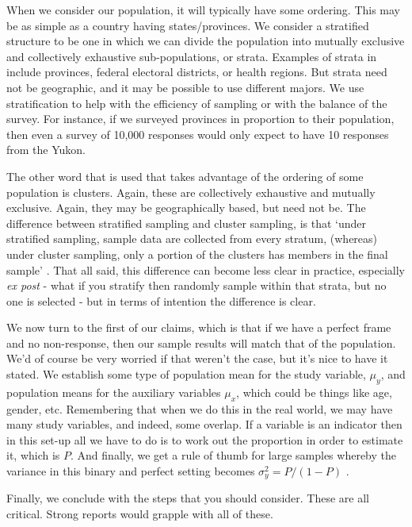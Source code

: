 \documentclass[
]{book}
\begin{document}
When we consider our population, it will typically have some ordering. This may be as simple as a country having states/provinces. We consider a stratified structure to be one in which we can divide the population into mutually exclusive and collectively exhaustive sub-populations, or strata. Examples of strata in \citet[p.~8]{wuandthompson} include provinces, federal electoral districts, or health regions. But strata need not be geographic, and it may be possible to use different majors. We use stratification to help with the efficiency of sampling or with the balance of the survey. For instance, if we surveyed provinces in proportion to their population, then even a survey of 10,000 responses would only expect to have 10 responses from the Yukon.

The other word that is used that takes advantage of the ordering of some population is clusters. Again, these are collectively exhaustive and mutually exclusive. Again, they may be geographically based, but need not be. The difference between stratified sampling and cluster sampling, is that `under stratified sampling, sample data are collected from every stratum, (whereas) under cluster sampling, only a portion of the clusters has members in the final sample' \citet[p.~8]{wuandthompson}. That all said, this difference can become less clear in practice, especially \emph{ex post} - what if you stratify then randomly sample within that strata, but no one is selected - but in terms of intention the difference is clear.

We now turn to the first of our claims, which is that if we have a perfect frame and no non-response, then our sample results will match that of the population. We'd of course be very worried if that weren't the case, but it's nice to have it stated. We establish some type of population mean for the study variable, \(\mu_y\), and population means for the auxiliary variables \(\mu_x\), which could be things like age, gender, etc. Remembering that when we do this in the real world, we may have many study variables, and indeed, some overlap. If a variable is an indicator then in this set-up all we have to do is to work out the proportion in order to estimate it, which is \(P\). And finally, we get a rule of thumb for large samples whereby the variance in this binary and perfect setting becomes \(\sigma_y^2 = P/(1-P)\) \citep[p.~11]{wuandthompson}.

Finally, we conclude with the steps that you should consider. These are all critical. Strong reports would grapple with all of these.
\end{document}
